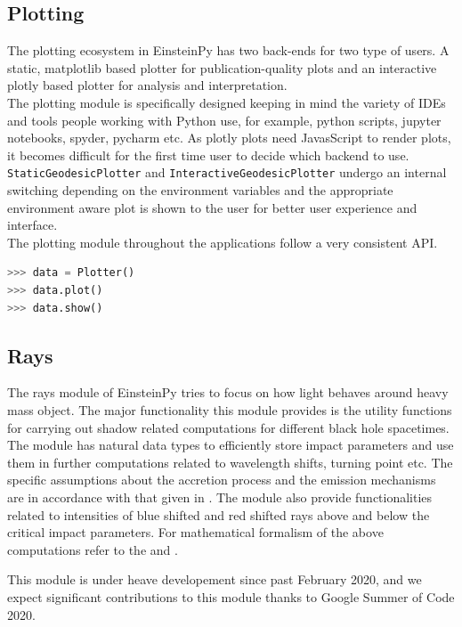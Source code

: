 \documentclass[onecolumn]{aa}
\begin{document}
\subsection{Plotting}
The plotting ecosystem in EinsteinPy has two back-ends for two type of users. A static, matplotlib based plotter for publication-quality plots and an interactive plotly based plotter for analysis and interpretation. \\
The plotting module is specifically designed keeping in mind the variety of IDEs and tools people working with Python use, for example, python scripts, jupyter notebooks, spyder, pycharm etc. As plotly plots need JavasScript to render plots, it becomes difficult for the first time user to decide which backend to use. \texttt{StaticGeodesicPlotter} and \texttt{InteractiveGeodesicPlotter} undergo an internal switching depending on the environment variables and the appropriate environment aware plot is shown to the user for better user experience and interface.\\
The plotting module throughout the applications follow a very consistent API. \begin{lstlisting}[language=Python, caption=Plotting Module API]
>>> data = Plotter()
>>> data.plot()
>>> data.show()
\end{lstlisting}

\subsection{Rays}
The rays module of EinsteinPy tries to focus on how light behaves around heavy mass object.
The major functionality this module provides is the utility functions for carrying out shadow related computations for different black hole spacetimes. The module has natural data types to efficiently store impact parameters and use them in further computations related to wavelength shifts, turning point etc. The specific assumptions about the accretion process and the emission mechanisms are in accordance with that given in \citep{Bambi_2013}.
The module also provide functionalities related to intensities of blue shifted and red shifted rays above and below the critical impact parameters. For mathematical formalism of the above computations refer to the \citep{Bambi_2013} and \citep{Shaikh_2018}.

This module is under heave developement since past February 2020, and we expect significant contributions to this module thanks to Google Summer of Code 2020.
\end{document}
